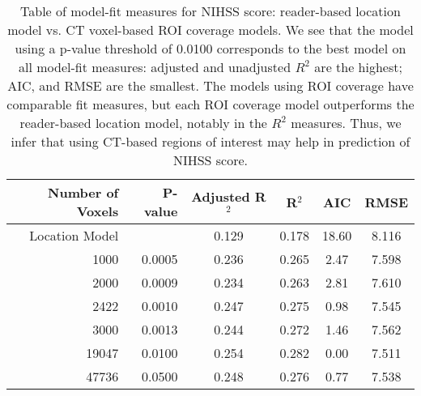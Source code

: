 \begin{table}[H]
\centering
\begin{tabular}{rrcccc}
  \hline
{\bf Number of Voxels} & {\bf P-value} & {\bf Adjusted R$^2$} & {\bf R$^2$} & {\bf AIC} & {\bf RMSE} \\ 
  \hline
Location Model &  & 0.129 & 0.178 & 18.60 & 8.116 \\ 
  1000 & 0.0005 & 0.236 & 0.265 & 2.47 & 7.598 \\ 
  2000 & 0.0009 & 0.234 & 0.263 & 2.81 & 7.610 \\ 
  2422 & 0.0010 & 0.247 & 0.275 & 0.98 & 7.545 \\ 
  3000 & 0.0013 & 0.244 & 0.272 & 1.46 & 7.562 \\ 
  19047 & 0.0100 & 0.254 & 0.282 & 0.00 & 7.511 \\ 
  47736 & 0.0500 & 0.248 & 0.276 & 0.77 & 7.538 \\ 
   \hline
\end{tabular}
\caption{Table of model-fit measures for NIHSS score: reader-based location model vs. CT voxel-based ROI coverage models. We see that the model using a p-value threshold of 0.0100 corresponds to the best model on all model-fit measures: adjusted and unadjusted $R^2$ are the highest; AIC, and RMSE are the smallest.  The models using ROI coverage have comparable fit measures, but each ROI coverage model outperforms the reader-based location model, notably in the $R^2$ measures.  Thus, we infer that using CT-based regions of interest may help in prediction of NIHSS score.} 
\label{t:nihss}
\end{table}
